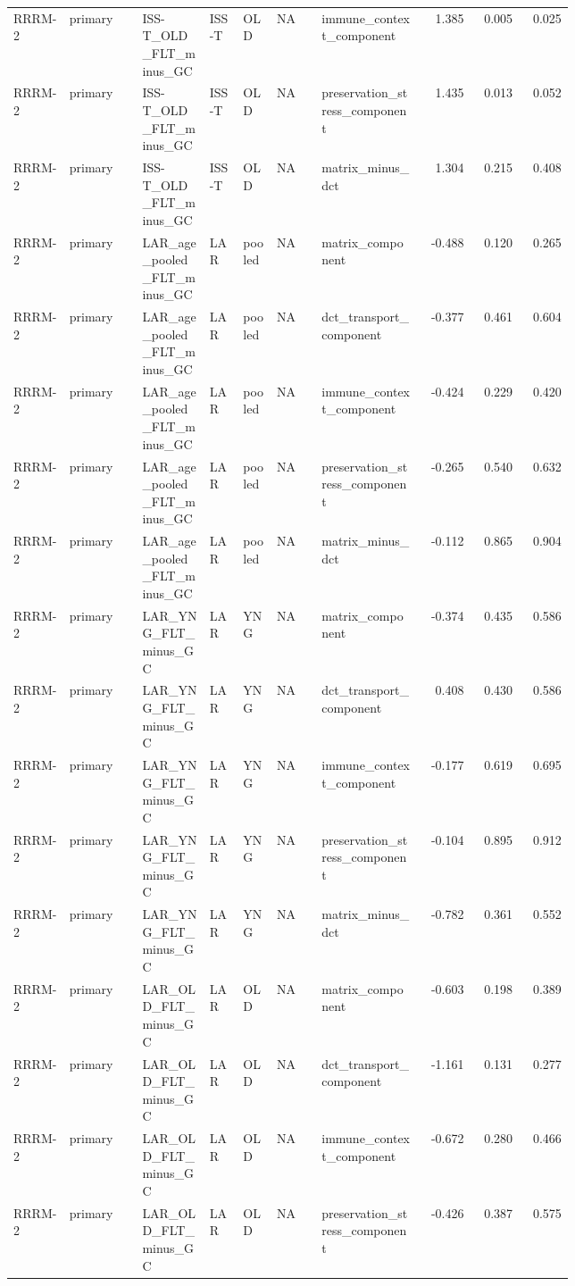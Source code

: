 \documentclass[11pt]{article}
\begin{document}
\begin{landscape}
\begin{longtable}{p{0.10\linewidth}p{0.13\linewidth}p{0.12\linewidth}p{0.06\linewidth}p{0.06\linewidth}p{0.08\linewidth}p{0.18\linewidth}rrr}
RRRM-2 & primary & ISS-T\_OLD\_FLT\_minus\_GC & ISS-T & OLD & NA & immune\_context\_component & 1.385 & 0.005 & 0.025 \\
RRRM-2 & primary & ISS-T\_OLD\_FLT\_minus\_GC & ISS-T & OLD & NA & preservation\_stress\_component & 1.435 & 0.013 & 0.052 \\
RRRM-2 & primary & ISS-T\_OLD\_FLT\_minus\_GC & ISS-T & OLD & NA & matrix\_minus\_dct & 1.304 & 0.215 & 0.408 \\
RRRM-2 & primary & LAR\_age\_pooled\_FLT\_minus\_GC & LAR & pooled & NA & matrix\_component & -0.488 & 0.120 & 0.265 \\
RRRM-2 & primary & LAR\_age\_pooled\_FLT\_minus\_GC & LAR & pooled & NA & dct\_transport\_component & -0.377 & 0.461 & 0.604 \\
RRRM-2 & primary & LAR\_age\_pooled\_FLT\_minus\_GC & LAR & pooled & NA & immune\_context\_component & -0.424 & 0.229 & 0.420 \\
RRRM-2 & primary & LAR\_age\_pooled\_FLT\_minus\_GC & LAR & pooled & NA & preservation\_stress\_component & -0.265 & 0.540 & 0.632 \\
RRRM-2 & primary & LAR\_age\_pooled\_FLT\_minus\_GC & LAR & pooled & NA & matrix\_minus\_dct & -0.112 & 0.865 & 0.904 \\
RRRM-2 & primary & LAR\_YNG\_FLT\_minus\_GC & LAR & YNG & NA & matrix\_component & -0.374 & 0.435 & 0.586 \\
RRRM-2 & primary & LAR\_YNG\_FLT\_minus\_GC & LAR & YNG & NA & dct\_transport\_component & 0.408 & 0.430 & 0.586 \\
RRRM-2 & primary & LAR\_YNG\_FLT\_minus\_GC & LAR & YNG & NA & immune\_context\_component & -0.177 & 0.619 & 0.695 \\
RRRM-2 & primary & LAR\_YNG\_FLT\_minus\_GC & LAR & YNG & NA & preservation\_stress\_component & -0.104 & 0.895 & 0.912 \\
RRRM-2 & primary & LAR\_YNG\_FLT\_minus\_GC & LAR & YNG & NA & matrix\_minus\_dct & -0.782 & 0.361 & 0.552 \\
RRRM-2 & primary & LAR\_OLD\_FLT\_minus\_GC & LAR & OLD & NA & matrix\_component & -0.603 & 0.198 & 0.389 \\
RRRM-2 & primary & LAR\_OLD\_FLT\_minus\_GC & LAR & OLD & NA & dct\_transport\_component & -1.161 & 0.131 & 0.277 \\
RRRM-2 & primary & LAR\_OLD\_FLT\_minus\_GC & LAR & OLD & NA & immune\_context\_component & -0.672 & 0.280 & 0.466 \\
RRRM-2 & primary & LAR\_OLD\_FLT\_minus\_GC & LAR & OLD & NA & preservation\_stress\_component & -0.426 & 0.387 & 0.575 \\

\end{longtable}
\end{landscape}
\end{document}
